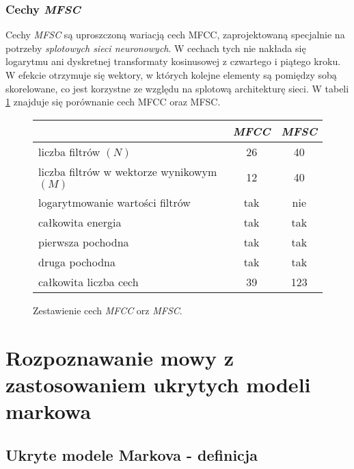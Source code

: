 \documentclass[11pt]{article}
\begin{document}
	\subsubsection{Cechy \textit{MFSC}}
	\label{sec:Feature_vec_mfsc}
	
	Cechy \textit{MFSC} są uproszczoną wariacją cech MFCC, zaprojektowaną specjalnie na potrzeby \textit{splotowych sieci neuronowych}. W cechach tych nie nakłada się logarytmu ani dyskretnej transformaty kosinusowej z czwartego i piątego kroku. W efekcie otrzymuje się wektory, w których kolejne elementy są pomiędzy sobą skorelowane, co jest korzystne ze względu na splotową architekturę sieci. W tabeli \ref{fig:feature_comparision} znajduje się porównanie cech MFCC oraz MFSC.
	
	\begin{figure}
		\begin{center}
			\begin{tabular}{|l|c|c|}
				\hline
				                                          & \textit{MFCC} & \textit{MFSC} \\ 
                \hline
				liczba filtrów $(N)$                      &       26      &      40       \\
				liczba filtrów w wektorze wynikowym $(M)$ &       12      &      40       \\  
				logarytmowanie wartości filtrów           &       tak     &      nie      \\
				całkowita energia                         &       tak     &      tak      \\
				pierwsza pochodna                         &       tak     &      tak      \\
				druga pochodna                            &       tak     &      tak      \\
				całkowita liczba cech                     &       39      &      123      \\
				\hline
				
			\end{tabular}			
		\end{center}
		\label{fig:feature_comparision}
		\caption{Zestawienie cech \textit{MFCC} orz \textit{MFSC}.}
	\end{figure}
	

\section {Rozpoznawanie mowy z zastosowaniem ukrytych modeli markowa}
	\label{sec:ASR_HMM}
    \subsection{Ukryte modele Markova - definicja}
    
\end{document}
